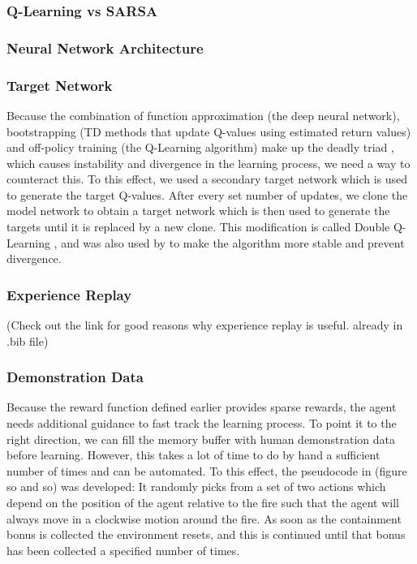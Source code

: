 \subsubsection{Q-Learning vs SARSA}\label{sec:ql_sarsa}

\subsubsection{Neural Network Architecture}\label{sec:architecture}

\subsubsection{Target Network}\label{sec:target_network}
Because the combination of function approximation (the deep neural network), bootstrapping (TD methods that update Q-values using estimated return values) and off-policy training (the Q-Learning algorithm) make up the deadly triad \citep{sutton_barto_2018}, which causes instability and divergence in the learning process, we need a way to counteract this. To this effect, we used a secondary target network which is used to generate the target Q-values. After every set number of updates, we clone the model network to obtain a target network which is then used to generate the targets until it is replaced by a new clone. This modification is called Double Q-Learning \citep{NIPS2010_3964}, and was also used by \citep{mnih2015human} to make the algorithm more stable and prevent divergence.

\subsubsection{Experience Replay}\label{sec:exp_replay}
(Check out the link for good reasons why experience replay is useful. already in .bib file)

\subsubsection{Demonstration Data}\label{sec:demo_data}
Because the reward function defined earlier provides sparse rewards, the agent needs additional guidance to fast track the learning process. To point it to the right direction, we can fill the memory buffer with human demonstration data before learning. However, this takes a lot of time to do by hand a sufficient number of times and can be automated. To this effect, the pseudocode in (figure so and so) was developed: It randomly picks from a set of two actions which depend on the position of the agent relative to the fire such that the agent will always move in a clockwise motion around the fire. As soon as the containment bonus is collected the environment resets, and this is continued until that bonus has been collected a specified number of times.

